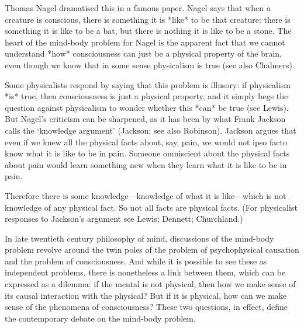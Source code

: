 Thomas Nagel dramatised this in a famous paper\autocite{Nagel1}. Nagel says that
when a creature is conscious, there is something it is *like* to be that creature: there
is something it is like to be a bat, but there is nothing it is like to be a stone. The heart
of the mind-body problem for Nagel is the apparent fact that we cannot understand
*how* consciousness can just be a physical property of the brain, even though we
know that in some sense physicalism is true (see also Chalmers\autocite{Chalmers1}).

Some physicalists respond by saying that this problem is illusory: if physicalism
*is* true, then consciousness is just a physical property, and it simply begs the
question against physicalism to wonder whether this *can* be true (see Lewis\autocite{Lewis3}).
But Nagel’s criticism can be sharpened, as it has been by what Frank Jackson calls
the ‘knowledge argument’ (Jackson\autocite{Jackson2}; see also Robinson\autocite{Robinson1}). Jackson argues
that even if we knew all the physical facts about, say, pain, we would not ipso facto
know what it is like to be in pain. Someone omniscient about the physical facts
about pain would learn something new when they learn what it is like to be in pain.

Therefore there is some knowledge—knowledge of what it is like—which is not
knowledge of any physical fact. So not all facts are physical facts. (For physicalist
responses to Jackson’s argument see Lewis\autocite{Lewis4}; Dennett\autocite{Dennett1}; Churchland\autocite{Churchland1}.)

In late twentieth century philosophy of mind, discussions of the mind-body
problem revolve around the twin poles of the problem of psychophysical causation
and the problem of consciousness. And while it is possible to see these as
independent problems, there is nonetheless a link between them, which can be
expressed as a dilemma: if the mental is not physical, then how we make sense of its
causal interaction with the physical? But if it is physical, how can we make sense of
the phenomena of consciousness? These two questions, in effect, define the
contemporary debate on the mind-body problem.